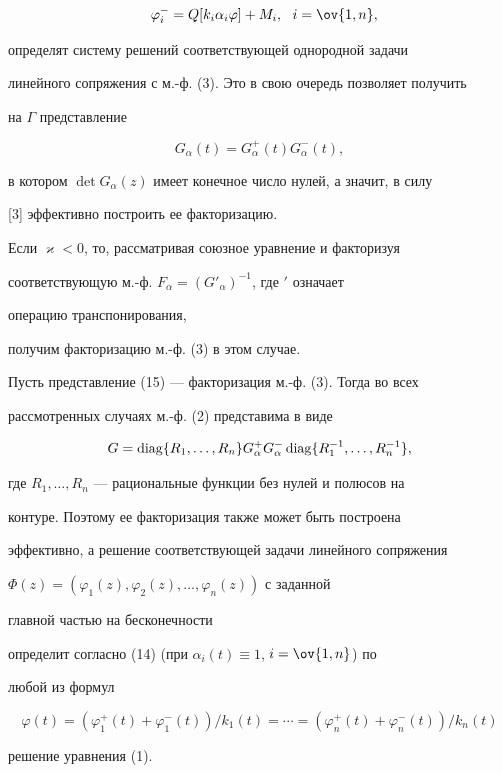 \begin{pf}
\begin{equation}
\ \ \varphi^-_i=Q[k_i\alpha_i\varphi]+M_i,\ \ i=\ov{1,n}, 


\end{equation} 


определят систему решений соответствующей однородной задачи 


линейного сопряжения с м.-ф. (3). Это в свою очередь позволяет получить 


на $\Gamma$ представление 


\begin{equation} 


G_\alpha(t)=G^+_\alpha(t)G^-_\alpha(t), 


\end{equation} 


в котором $\det G_\alpha(z)$ имеет конечное число нулей, а значит, в силу 


[3] эффективно построить ее факторизацию. 


 


Если $\varkappa<0$, то, рассматривая союзное уравнение и факторизуя 


соответствующую м.-ф. $F_\alpha=(G'_\alpha)^{-1}$, где $'$ означает 


операцию транспонирования, 


получим факторизацию м.-ф. (3) в этом случае. 


 


Пусть представление (15) --- факторизация м.-ф. (3). Тогда во всех 


рассмотренных случаях м.-ф. (2) представима в виде 


\begin{equation} 


G=\diag\{R_1,\dotsc,R_n\}G^+_\alpha G^-_\alpha\diag 


\{R^{-1}_1,\dotsc,R^{-1}_n\}, 


\end{equation} 


где $R_1,\dotsc,R_n$ --- рациональные функции без нулей и полюсов на 


контуре. Поэтому ее факторизация также может быть построена 


эффективно, а решение соответствующей задачи линейного сопряжения 


$\Phi(z)=(\varphi_1(z),\varphi_2(z),\dotsc,\varphi_n(z))$ с заданной 


главной частью на бесконечности 


определит согласно (14) (при $\alpha_i(t)\equiv1$, $i=\ov{1,n}$) по 


любой из формул 


\begin{equation} 


\varphi(t)=(\varphi^+_1(t)+\varphi^-_1(t))/k_1(t)=\dotsb= 


(\varphi^+_n(t)+\varphi^-_n(t))/k_n(t) 


\end{equation} 


решение уравнения (1). 


\end{pf} 


